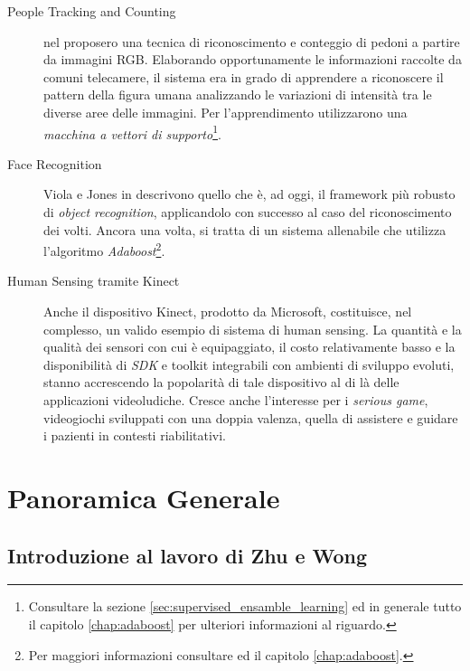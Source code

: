             \begin{description}
                \item[People Tracking and Counting] \citet{Papageorgiou98} nel \citeyear{Papageorgiou98} proposero una tecnica di riconoscimento e conteggio di pedoni a partire da immagini RGB.
                Elaborando opportunamente le informazioni raccolte da comuni telecamere, il sistema era in grado di apprendere a riconoscere il pattern della figura umana analizzando le variazioni di intensità tra le diverse aree delle immagini.
                Per l'apprendimento utilizzarono una \emph{macchina a vettori di supporto}\footnote{Consultare la sezione \ref{sec:supervised_ensamble_learning} ed in generale tutto il capitolo \ref{chap:adaboost} per ulteriori informazioni al riguardo.}.
                
                \item[Face Recognition] Viola e Jones in \cite{Viola04} descrivono quello che è, ad oggi, il framework più robusto di \emph{object recognition}, applicandolo con successo al caso del riconoscimento dei volti.
                Ancora una volta, si tratta di un sistema allenabile che utilizza l'algoritmo \emph{Adaboost}\footnote{Per maggiori informazioni consultare \cite{Freund97} ed il capitolo \ref{chap:adaboost}.}.

                \item[Human Sensing tramite Kinect] Anche il dispositivo Kinect, prodotto da Microsoft, costituisce, nel complesso, un valido esempio di sistema di human sensing.
                La quantità e la qualità dei sensori con cui è equipaggiato, il costo relativamente basso e la disponibilità di \emph{SDK} e toolkit integrabili con ambienti di sviluppo evoluti, stanno accrescendo la popolarità di tale dispositivo al di là delle applicazioni videoludiche.
                Cresce anche l'interesse per i \emph{serious game}, videogiochi sviluppati con una doppia valenza, quella di assistere e guidare i pazienti in contesti riabilitativi.
            \end{description}

    \section{Panoramica Generale}
    \label{sec:overview}
        \subsection{Introduzione al lavoro di Zhu e Wong}

